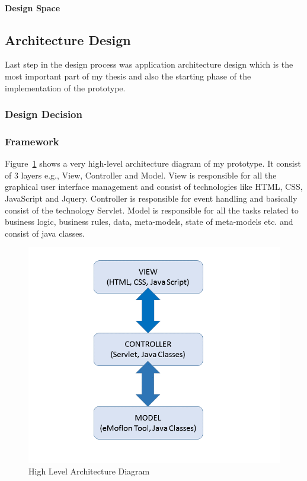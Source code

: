\paragraph{Design Space} 

\subsection{Architecture Design}\label{subsec:architecturedesign}
Last step in the design process was application architecture design which is the most important part of my thesis and also the starting phase of the implementation of the prototype.
\subsubsection{Design Decision}\label{subsubsec:architecturedesigndecision}

\subsubsection{Framework}\label{subsubsec:framework}
Figure~\ref{fig:Architecture_Diagram} shows a very high-level architecture diagram of my prototype. It consist of 3 layers e.g., View, Controller and Model. View is responsible for all the graphical user interface management and consist of technologies like HTML, CSS, JavaScript and Jquery. Controller is responsible for event handling and basically consist of the technology Servlet. Model is responsible for all the tasks related to business logic, business rules, data, meta-models, state of meta-models etc. and consist of java classes.
\begin{figure}
	\includegraphics[width=1\textwidth]{figures/Highlevel_Arch}
	\caption{High Level Architecture Diagram}
	\label{fig:Architecture_Diagram}
\end{figure}
\clearpage

